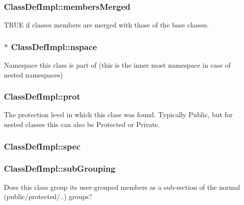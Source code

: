 \subsubsection[{members\+Merged}]{ Class\+Def\+Impl\+::members\+Merged}\label{class_class_def_impl_ab613a11051f5ad3265ddc3b25ef50a82}
T\+R\+U\+E if classes members are merged with those of the base classes. \hypertarget{class_class_def_impl_ab48a04c16cebd115877f07f540b44c15}{}
\subsubsection[{nspace}]{$\ast$ Class\+Def\+Impl\+::nspace}\label{class_class_def_impl_ab48a04c16cebd115877f07f540b44c15}
Namespace this class is part of (this is the inner most namespace in case of nested namespaces) \hypertarget{class_class_def_impl_a08fcc20edfd7a4c7090217f21389f929}{}
\subsubsection[{prot}]{ Class\+Def\+Impl\+::prot}\label{class_class_def_impl_a08fcc20edfd7a4c7090217f21389f929}
The protection level in which this class was found. Typically Public, but for nested classes this can also be Protected or Private. \hypertarget{class_class_def_impl_a9514ecc09bd2ee98965eb9bc6e0fa787}{}
\subsubsection[{spec}]{ Class\+Def\+Impl\+::spec}\label{class_class_def_impl_a9514ecc09bd2ee98965eb9bc6e0fa787}
\hypertarget{class_class_def_impl_ad11ebe89f9a6c199c5ef2b63ef2a10cc}{}
\subsubsection[{sub\+Grouping}]{ Class\+Def\+Impl\+::sub\+Grouping}\label{class_class_def_impl_ad11ebe89f9a6c199c5ef2b63ef2a10cc}
Does this class group its user-\/grouped members as a sub-\/section of the normal (public/protected/..) groups? \hypertarget{class_class_def_impl_a8753bef2143ebdef9451738751087e5f}{}
